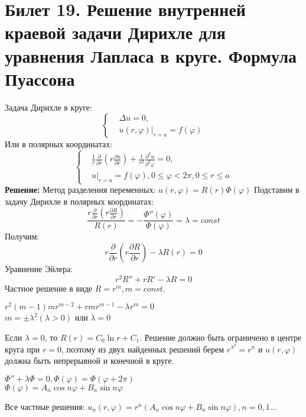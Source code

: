 \documentclass[11pt,a4paper]{article}
\begin{document}
    \section*{Билет 19. Решение внутренней краевой задачи Дирихле для уравнения Лапласа в круге. Формула Пуассона}
    Задача Дирихле в круге:
    \[ \left\{\begin{aligned}
    & \Delta u=0, \\ & u(r,\varphi)|_{r=a}=f(\varphi)
    \end{aligned}\right. \]
    Или в полярных координатах:
    \[ \left\{\begin{aligned}
    & \frac{1}{r} \frac{\partial}{\partial r}\left (r\frac{\partial u}{\partial r}\right)+\frac{1}{r^2}\frac{\partial^2 u}{\partial^2 \varphi}=0, \\ & u|_{r=a}=f(\varphi), 0\leq \varphi<2\pi, 0\leq r\leq a
    \end{aligned}\right. \]
    \textbf{Решение:}
    Метод разделения переменных: $u(r,\varphi)=R(r)\Phi(\varphi)$
    Подставим в задачу Дирихле в полярных координатах:
    \begin{equation}\label{eq:5}
    \frac{r\frac{\partial }{\partial r}\left(r\frac{\partial R}{\partial r} 
    \right)}{R(r)}=-\frac{\Phi''(\varphi)}{\Phi(\varphi)}=\lambda=const
    \end{equation}
    Получим:
    \begin{equation}\label{eq:1}
    r\frac{\partial }{\partial r}\left(r\frac{\partial R}{\partial r} 
    \right)-\lambda R(r)=0
    \end{equation}
    Уравнение Эйлера:
    \begin{equation}
    r^2R''+rR'-\lambda R=0
    \end{equation}
    Частное решение в виде $R=r^m, m=const$.
    \begin{center}
    $r^2(m-1)mr^{m-2}+rmr^{m-1}-\lambda r^m=0$\\
    $m=\pm \lambda^2 (\lambda>0)$ или $\lambda=0$
    \end{center}
    Если $\lambda=0$, то $R(r)=C_0\ln{r}+C_1$.
    Решение должно быть ограничено в центре круга при $r=0$, поэтому из двух найденных решений берем $r^{\lambda^2}=r^n$ и $u(r,\varphi)$ должна быть непрерывной и конечной в круге.
    \begin{center}
    $\Phi''+\lambda\Phi=0, \Phi(\varphi)=\Phi(\varphi+2\pi)$ \\
    $\Phi(\varphi)=A_n\cos{n\varphi}+B_n\sin{n\varphi}$
    \end{center}
    Все частные решения: $u_n(r,\varphi)=r^n(A_n\cos{n\varphi}+B_n\sin{n\varphi}), n=0,1...$
\end{document}
